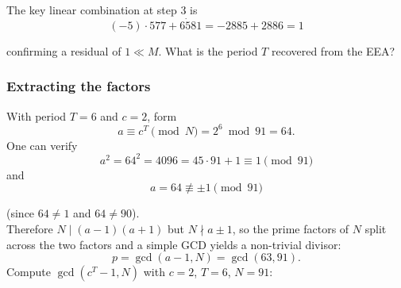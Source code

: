 The key linear combination at step 3 is
\begin{equation}
    (-5) \cdot 577 + 6 \dot 581 = -2885+2886 = 1
\end{equation}

confirming a residual of $1 \ll M$. What is the period $T$ recovered from the EEA? \\
\noindent{}


\subsubsection{Extracting the factors}
With period $T=6$ and $c=2$, form  \begin{equation}
a \equiv c^T \pmod N = 2^6 \bmod 91 = 64.
\end{equation}
One can verify
\begin{equation}
a^2 = 64^2 = 4096 = 45\cdot 91 + 1 \equiv 1 \pmod{91}
\end{equation}
and
\begin{equation}
a = 64 \not\equiv \pm 1 \pmod{91}
\end{equation}

(since $64 \neq 1$ and $64 \neq 90$). \\

Therefore $N \mid (a-1)(a+1)$ but $N \nmid a\pm 1$, so the prime factors of $N$ split across the two factors and a simple GCD yields a non-trivial divisor:
\begin{equation}
p = \gcd(a-1,N)=\gcd(63,91).
\end{equation}
Compute $\gcd(c^T-1,N)$ with $c=2$, $T=6$, $N=91$: \\
\noindent{}
